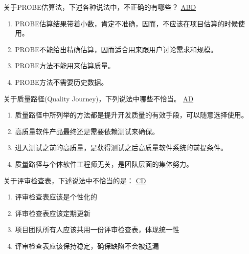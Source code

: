 \begin{problem}
	关于PROBE估算法，下述各种说法中，不正确的有哪些？
	\uline{ABD}    
        \begin{enumerate}[label=\Alph*.]
            \item PROBE估算结果带着小数，肯定不准确，因而，不应该在项目估算的时候使用。
            \item PROBE不能给出精确估算，因而适合用来跟用户讨论需求和规模。
            \item PROBE方法不能用来估算质量。
            \item PROBE方法不需要历史数据。
        \end{enumerate}
\end{problem}



\begin{problem}
	关于质量路径(Quality Journey)，下列说法中哪些不恰当。
	\uline{AD}    
        \begin{enumerate}[label=\Alph*.]
            \item 质量路径中所列举的方法都是提升开发质量的有效手段，可以随意选择使用。
            \item 高质量软件产品最终还是需要依赖测试来确保。
            \item 进入测试之前的高质量，是获得测试之后高质量软件系统的前提条件。
            \item 质量路径与个体软件工程师无关，是团队层面的集体努力。
        \end{enumerate}
\end{problem}



\begin{problem}
	关于评审检查表，下述说法中不恰当的是：
	\uline{CD}    
        \begin{enumerate}[label=\Alph*.]
            \item 评审检查表应该是个性化的
            \item 评审检查表应该定期更新
            \item 项目团队所有人应该共用一份评审检查表，体现统一性
            \item 评审检查表应该保持稳定，确保缺陷不会被遗漏
        \end{enumerate}
\end{problem}




